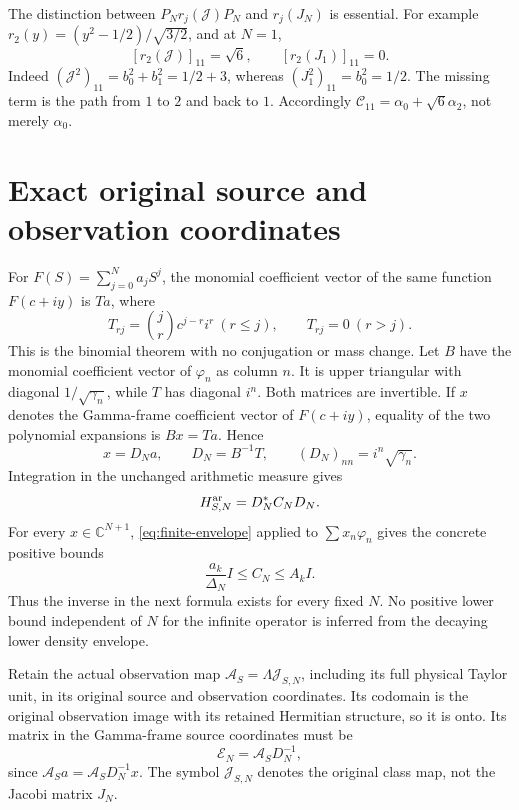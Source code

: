 \documentclass[11pt]{article}
\newcommand{\C}{\mathbb C}
\newcommand{\J}{\mathcal J}
\newcommand{\CC}{\mathcal C}
\begin{document}
The distinction between $P_Nr_j(\J)P_N$ and $r_j(J_N)$ is essential.
For example $r_2(y)=(y^2-1/2)/\sqrt{3/2}$, and at $N=1$,
\[
 [r_2(\J)]_{11}=\sqrt6,\qquad [r_2(J_1)]_{11}=0.
\]
Indeed $(\J^2)_{11}=b_0^2+b_1^2=1/2+3$, whereas
$(J_1^2)_{11}=b_0^2=1/2$. The missing term is the path from $1$
to $2$ and back to $1$. Accordingly
$\CC_{11}=\alpha_0+\sqrt6\alpha_2$, not merely $\alpha_0$.

\section{Exact original source and observation coordinates}

For $F(S)=\sum_{j=0}^N a_jS^j$, the monomial coefficient vector
of the same function $F(c+iy)$ is $Ta$, where
\[
 T_{rj}=\binom jr c^{j-r}i^r\ (r\leq j),\qquad T_{rj}=0\ (r>j).
\]
This is the binomial theorem with no conjugation or mass change.
Let $B$ have the monomial coefficient vector of $\varphi_n$ as
column $n$. It is upper triangular with diagonal
$1/\sqrt{\gamma_n}$, while $T$ has diagonal $i^n$.
Both matrices are invertible. If $x$ denotes the Gamma-frame
coefficient vector of $F(c+iy)$, equality of the two polynomial
expansions is $Bx=Ta$. Hence
\begin{equation}\label{eq:source}
 x=D_Na,\qquad D_N=B^{-1}T,\qquad
 (D_N)_{nn}=i^n\sqrt{\gamma_n}.
\end{equation}
Integration in the unchanged arithmetic measure gives
\begin{equation}\label{eq:gram}
 H_{S,N}^{\rm ar}=D_N^*C_ND_N.
\end{equation}
For every $x\in\C^{N+1}$, \eqref{eq:finite-envelope} applied to
$\sum x_n\varphi_n$ gives the concrete positive bounds
\begin{equation}\label{eq:CN-bounds}
 \frac{a_k}{\Delta_N}I\leq C_N\leq A_kI.
\end{equation}
Thus the inverse in the next formula exists for every fixed $N$.
No positive lower bound independent of $N$ for the infinite
operator is inferred from the decaying lower density envelope.

Retain the actual observation map
$\mathcal A_S=\Lambda\mathcal J_{S,N}$, including its full physical
Taylor unit, in its original source and observation coordinates.
Its codomain is the original observation image with its retained
Hermitian structure, so it is onto. Its matrix in the Gamma-frame
source coordinates must be
\begin{equation}\label{eq:E}
 \mathcal E_N=\mathcal A_SD_N^{-1},
\end{equation}
since $\mathcal A_Sa=\mathcal A_SD_N^{-1}x$. The symbol
$\mathcal J_{S,N}$ denotes the original class map, not the Jacobi
matrix $J_N$.
\end{document}
